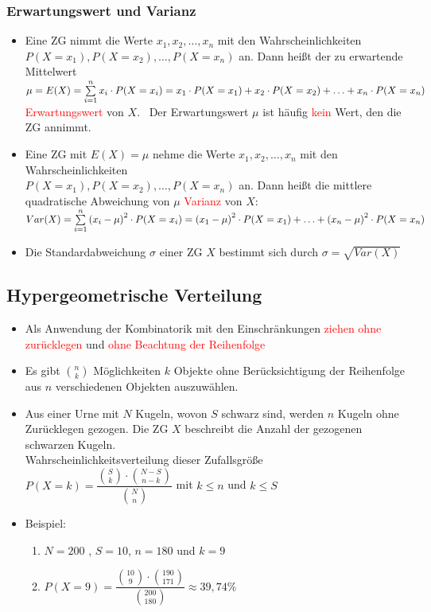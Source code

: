 \documentclass[a4paper,twocolumn,10pt]{onepgnote1}
\renewcommand\mynote{\notebox{Hinweis:}\ }  %
\begin{document}
\subsubsection{Erwartungswert und Varianz}
\begin{itemize}
    \item Eine ZG nimmt die Werte $x_1, x_2,\ldots , x_n$ mit den Wahrscheinlichkeiten $P(X=x_1), P(X=x_2), \ldots, P(X=x_n)$ an. Dann heißt der zu erwartende Mittelwert\\ $ \mu =E(X) = \sum\limits_{i=1}^n x_i\cdot P(X=x_i) \\= x_1\cdot P(X=x_1) + x_2\cdot P(X=x_2) +\ldots + x_n \cdot P(X=x_n)$ \textcolor{red}{Erwartungswert} von $X$. \mynote Der Erwartungswert $\mu$ ist häufig \textcolor{red}{kein} Wert, den die ZG annimmt.
    \item Eine ZG mit $E(X) = \mu$ nehme die Werte $x_1, x_2,\ldots , x_n$ mit den Wahrscheinlichkeiten\\ $P(X=x_1), P(X=x_2), \ldots, P(X=x_n)$ an. Dann heißt die mittlere quadratische Abweichung von $\mu$ \textcolor{red}{Varianz} von $X$: \\ $Var(X) = \sum\limits_{i=1}^n \left(x_i - \mu\right)^2 \cdot P(X = x_i)\\ = \left(x_1 - \mu\right)^2 \cdot P(X = x_1) + \ldots + \left(x_n - \mu\right)^2 \cdot P(X = x_n)$
    \item Die Standardabweichung $\sigma$ einer ZG $X$ bestimmt sich durch $\sigma = \sqrt{Var(X)}$
\end{itemize}

\subsection{Hypergeometrische Verteilung}
\begin{itemize}
    \item Als Anwendung der Kombinatorik mit den Einschränkungen \textcolor{red}{ziehen ohne zurücklegen} und \textcolor{red}{ohne Beachtung der Reihenfolge}
    \item Es gibt $\binom{n}{k}$ Möglichkeiten $k$ Objekte ohne Berücksichtigung der Reihenfolge aus $n$ verschiedenen Objekten auszuwählen.
    \item Aus einer Urne mit $N$ Kugeln, wovon $S$ schwarz sind, werden $n$ Kugeln ohne Zurücklegen gezogen. Die ZG $X$ beschreibt die Anzahl der gezogenen schwarzen Kugeln.\\
Wahrscheinlichkeitsverteilung dieser Zufallsgröße \\$P(X = k) = \dfrac{\binom{S}{k}\cdot \binom{N-S}{n-k}}{\binom{N}{n}}$ mit $k\leq n$ und $k\leq S$
\item Beispiel: 
\begin{enumerate}
\item $N=200$ , $S = 10$, $n=180$ und $k=9$\\
    \item $P(X=9)= \dfrac {\binom{10}{9} \cdot \binom {190}{171}}{\binom{200}{180}} \approx 39,74\%$
\end{enumerate}
\end{itemize}
\end{document}
